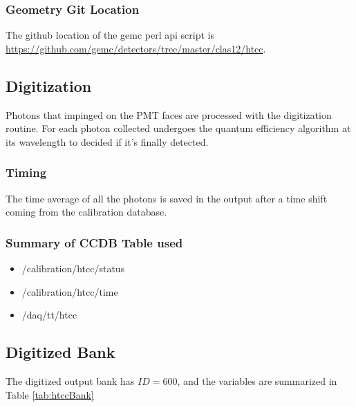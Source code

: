 \subsubsection{Geometry Git Location}
The github location of the gemc perl api script is \url{https://github.com/gemc/detectors/tree/master/clas12/htcc}.



\subsection{Digitization}
Photons that impinged on the PMT faces are processed with the digitization routine.
For each photon collected undergoes the quantum efficiency algorithm at its wavelength to decided if it's finally detected.

\subsubsection{Timing}

The time average of all the photons is saved in the output after a time shift coming from the calibration database.


\subsubsection{Summary of CCDB Table used}
\begin{itemize}
	\item /calibration/htcc/status
	\item /calibration/htcc/time
	\item /daq/tt/htcc
\end{itemize}

\subsection{Digitized Bank}
The digitized output bank has $ID=600$, and the variables are summarized in Table \ref{tab:htccBank}

